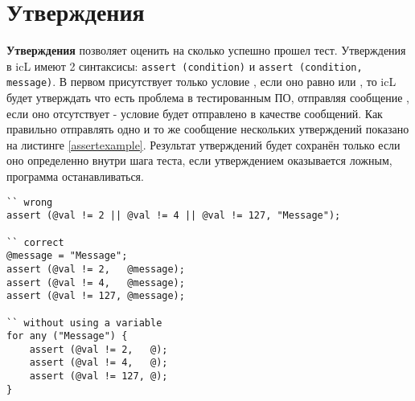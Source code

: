 \section{Утверждения}

{\bf Утверждения} позволяет оценить на сколько успешно прошел тест. Утверждения в icL имеют 2 синтаксисы: \lstinline|assert (condition)| и \lstinline|assert (condition, message)|. В первом присутствует только условие , если оно равно \false{} или \void, то icL будет утверждать что есть проблема в тестированным ПО, отправляя сообщение , если оно отсутствует - условие будет отправлено в качестве сообщений. Как правильно отправлять одно и то же сообщение нескольких утверждений показано на листинге \ref{assertexample}. Результат утверждений будет сохранён только если оно определенно внутри шага теста, если утверждением оказывается ложным, программа останавливаться.

\begin{lstlisting}[caption=Пример использования утверждениях, label=assertexample]
`` wrong
assert (@val != 2 || @val != 4 || @val != 127, "Message");

`` correct
@message = "Message";
assert (@val != 2,   @message);
assert (@val != 4,   @message);
assert (@val != 127, @message);

`` without using a variable
for any ("Message") {
	assert (@val != 2,   @);
	assert (@val != 4,   @);
	assert (@val != 127, @);
}
\end{lstlisting}
